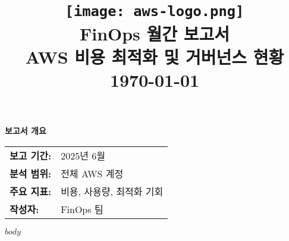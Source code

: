 \documentclass[11pt,a4paper]{article}
\title{
    \vspace{-2cm}
    \begin{center}
    \texttt{[image: aws-logo.png]}\\[1cm]
    {\Huge\color{finopsblue}\textbf{FinOps 월간 보고서}}\\[0.5cm]
    {\Large\color{finopsgray}AWS 비용 최적화 및 거버넌스 현황}\\[0.3cm]
    {\large\color{finopsgray}\today}
    \end{center}
    \vspace{1cm}
}
\author{}
\date{}
\begin{document}
\maketitle
\thispagestyle{empty}

\vfill

\begin{center}
\begin{tcolorbox}[width=0.8\textwidth,colback=lightgray,colframe=finopsgray,arc=5pt]
\centering
\textbf{\Large 보고서 개요}\\[0.5cm]
\begin{tabular}{ll}
\textbf{보고 기간:} & 2025년 6월 \\
\textbf{분석 범위:} & 전체 AWS 계정 \\
\textbf{주요 지표:} & 비용, 사용량, 최적화 기회 \\
\textbf{작성자:} & FinOps 팀 \\
\end{tabular}
\end{tcolorbox}
\end{center}

\newpage

\tableofcontents
\newpage

$body$
\end{document}
